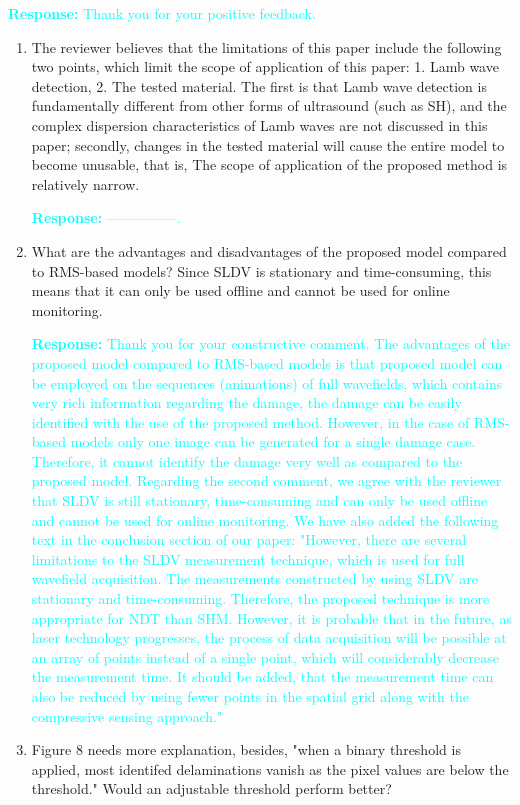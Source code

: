 \documentclass[11pt,a2paper]{report}
\begin{document}
\textcolor{Cyan}{
	\newline\textbf{Response:}
	Thank you for your positive feedback.
}
\begin{enumerate}
	\item The reviewer believes that the limitations of this paper include the 
	following two points, which limit the scope of application of this paper: 
	1. Lamb wave detection, 2. The tested material. The first is that Lamb wave 
	detection is fundamentally different from other forms of ultrasound (such 
	as SH), and the complex dispersion characteristics of Lamb waves are not 
	discussed in this paper; secondly, changes in the tested material will 
	cause the entire model to become unusable, that is, The scope of 
	application of the proposed method is relatively narrow.
	
	\textcolor{Cyan}{
		\textbf{Response:}
		---------------.
	}
	
	\item What are the advantages and disadvantages of the proposed model 
	compared to RMS-based models? Since SLDV is stationary and time-consuming, 
	this means that it can only be used offline and cannot be used for online 
	monitoring.
	
	\textcolor{Cyan}{
		\textbf{Response:}
		Thank you for your constructive comment.
		The advantages of the proposed model compared to RMS-based models is 
		that proposed model can be employed on the sequences (animations) of 
		full wavefields, which contains very rich information regarding the 
		damage, the damage can be easily identified with the use of the 
		proposed method. 
		However, in the case of RMS-based models only one image can be 
		generated for a single damage case.
		Therefore, it cannot identify the damage very well as compared to the 
		proposed model.  
		\newline Regarding the second comment, we agree with the reviewer that 
		SLDV is 
		still stationary, time-consuming and can only be used offline and 
		cannot be used for online monitoring.
		We have also added the following text in the conclusion section of our 
		paper:
		\newline "However, there are several limitations to the SLDV measurement
		technique, which is used for full wavefield acquisition. The 
		measurements constructed by using SLDV are stationary and 
		time-consuming. 
		Therefore, the proposed technique is more appropriate for NDT than SHM. 
		However, it is probable that in the future, as laser technology 
		progresses, the process of data acquisition will be possible at an 
		array of points instead of a single point, which will considerably 
		decrease the measurement time. It should be added, that the measurement
		time can also be reduced by using fewer points in the spatial grid 
		along with the compressive sensing approach."
	}
	\item Figure 8 needs more explanation, besides, "when a binary threshold is 
	applied, most identifed delaminations vanish as the pixel values are below 
	the threshold." Would an adjustable threshold perform better?
	

\end{enumerate}
\end{document}
